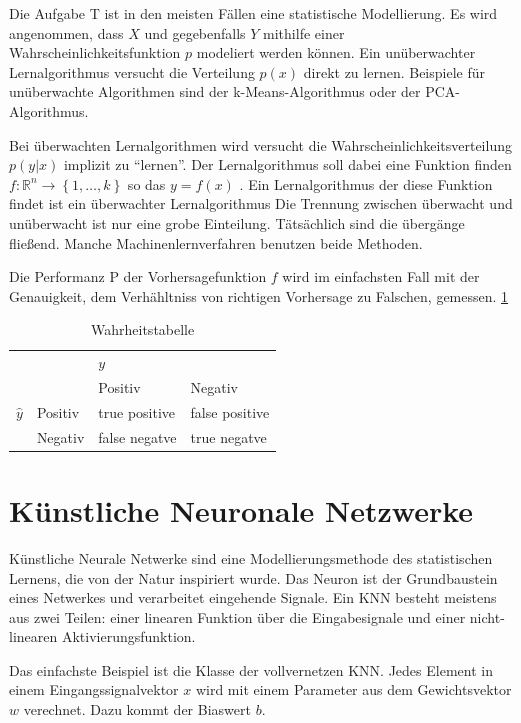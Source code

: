Die Aufgabe T ist in den meisten Fällen eine statistische Modellierung.
Es wird angenommen, dass \(X\) und gegebenfalls \(Y\) mithilfe einer Wahrscheinlichkeitsfunktion \(p\)
modeliert werden können. 
Ein unüberwachter Lernalgorithmus versucht die Verteilung \(p(x)\) direkt zu lernen.
Beispiele für unüberwachte Algorithmen sind der k-Means-Algorithmus oder der PCA-Algorithmus.

Bei überwachten Lernalgorithmen wird versucht die Wahrscheinlichkeitsverteilung \(p(y | x)\) implizit zu ``lernen''.
Der Lernalgorithmus soll dabei eine Funktion finden \(f: \mathds{R}^n \rightarrow \left\{1,\dots,k \right\} \) so das \(y = f\left(x\right)\) \parencite[97 ff]{GoodfellowDeeplearning2016}.
Ein Lernalgorithmus der diese Funktion findet ist ein überwachter Lernalgorithmus 
Die Trennung zwischen überwacht und unüberwacht ist nur eine grobe Einteilung. Tätsächlich sind die übergänge fließend. 
Manche Machinenlernverfahren benutzen beide Methoden.  

Die Performanz P der Vorhersagefunktion \(f\) wird im einfachsten Fall mit der Genauigkeit,
dem Verhähltniss von richtigen Vorhersage zu Falschen, gemessen. 
\cref{tab:truth}
\begin{table}
    \caption{Wahrheitstabelle}
    \label{tab:truth}
    \begin{tabular}{llll}
                    &&\(y\)& \\
                            && Positiv       & Negativ \\
    \(\hat{y}\) & Positiv  & true positive  & false positive \\
                & Negativ & false negatve   & true negatve \\
    \end{tabular}       
\end{table}    
\section{Künstliche Neuronale Netzwerke}

Künstliche Neurale Netwerke  sind eine Modellierungsmethode des statistischen Lernens, die von der Natur inspiriert wurde. 
Das Neuron ist der Grundbaustein eines Netwerkes und verarbeitet eingehende Signale. 
Ein KNN besteht meistens aus zwei Teilen: einer linearen Funktion über die Eingabesignale und 
einer nicht-linearen Aktivierungsfunktion.

Das einfachste Beispiel ist die Klasse der vollvernetzen KNN. 
Jedes Element in einem Eingangssignalvektor \(x\) wird mit einem Parameter aus dem Gewichtsvektor \(w\) verechnet. Dazu kommt der Biaswert \(b\).

